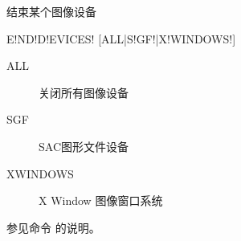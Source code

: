 \label{cmd:enddevices}

结束某个图像设备

\begin{SACSTX}
E!ND!D!EVICES! [ALL|S!GF!|X!WINDOWS!]
\end{SACSTX}

\begin{description}
\item [ALL] 关闭所有图像设备
\item [SGF] SAC图形文件设备
\item [XWINDOWS] X Window 图像窗口系统
\end{description}

参见命令  的说明。
